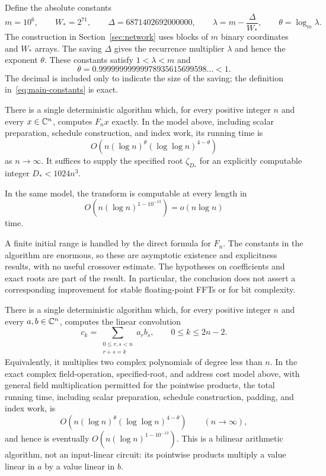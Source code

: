 Define the absolute constants
\begin{equation}\label{eq:main-constants}
 m=10^6,\qquad W_*=2^{71},\qquad
 \Delta=6871402692000000,\qquad
 \lambda=m-\frac{\Delta}{W_*},\qquad
 \theta=\log_m\lambda.
\end{equation}
The construction in Section~\ref{sec:network} uses blocks of $m$ binary
coordinates and $W_*$ arrays. The saving $\Delta$ gives the recurrence
multiplier $\lambda$ and hence the exponent $\theta$.
These constants satisfy $1<\lambda<m$ and
\[
 \theta=0.99999999999978935615699598\ldots<1.
\]
The decimal is included only to indicate the size of the saving; the definition in~\eqref{eq:main-constants} is exact.

\begin{theorem}\label{thm:main}
There is a single deterministic algorithm which, for every positive integer $n$ and every $x\in\mathbb C^n$, computes $F_nx$ exactly. In the model above, including scalar preparation, schedule construction, and index work, its running time is
\begin{equation}\label{eq:main-bound}
 O\!\left(n(\log n)^\theta(\log\log n)^{4-\theta}\right)
\end{equation}
as $n\to\infty$. It suffices to supply the specified root $\zeta_{D_*}$ for an explicitly computable integer $D_*<1024n^3$.
\end{theorem}

\begin{corollary}\label{cor:decimal}
In the same model, the transform is computable at every length in
\[
 O\!\left(n(\log n)^{1-10^{-13}}\right)=o(n\log n)
\]
time.
\end{corollary}

A finite initial range is handled by the direct formula for $F_n$. The constants in the algorithm are enormous, so these are asymptotic existence and explicitness results, with no useful crossover estimate. The hypotheses on coefficients and exact roots are part of the result. In particular, the conclusion does not assert a corresponding improvement for stable floating-point FFTs or for bit complexity.

\begin{corollary}
\label{cor:polynomial-multiplication}
There is a single deterministic algorithm which, for every positive integer
$n$ and every $a,b\in\mathbb C^n$, computes the linear convolution
\[
 c_k=\sum_{\substack{0\le r,s<n\\r+s=k}}a_rb_s,
 \qquad 0\le k\le 2n-2.
\]
Equivalently, it multiplies two complex polynomials of degree less than $n$.
In the exact complex field-operation, specified-root, and address cost model
above, with general field multiplication permitted for the pointwise products,
the total running time, including scalar preparation, schedule construction,
padding, and index work, is
\[
 O\!\left(n(\log n)^\theta(\log\log n)^{4-\theta}\right)
 \qquad(n\to\infty),
\]
and hence is eventually $O(n(\log n)^{1-10^{-13}})$.
This is a bilinear arithmetic algorithm, not an input-linear circuit: its
pointwise products multiply a value linear in $a$ by a value linear in $b$.
\end{corollary}

